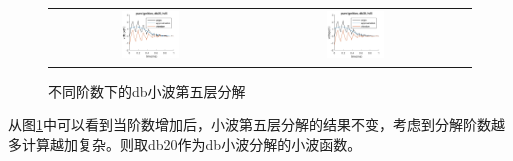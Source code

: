 \begin{figure}[!htb]
\begin{tabular}{ccc}
		\includegraphics[width=0.3\textwidth]{thesis_figure/ion_chapter/db25_lvl5}&
		\includegraphics[width=0.3\textwidth]{thesis_figure/ion_chapter/db30_lvl5}
	\end{tabular}
	\caption{\label{fig:dbvar}不同阶数下的db小波第五层分解}
\end{figure}
从图\ref{fig:dbvar}中可以看到当阶数增加后，小波第五层分解的结果不变，考虑到分解阶数越多计算越加复杂。则取db20作为db小波分解的小波函数。
